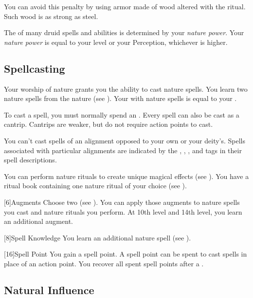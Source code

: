         You can avoid this penalty by using armor made of wood altered with the  ritual.
        Such wood is as strong as steel.

        The  of many druid spells and abilities is determined by your \textit{nature power}.
        Your \textit{nature power} is equal to your level or your Perception, whichever is higher.

    \subsection{Spellcasting}

        Your worship of nature grants you the ability to cast nature spells.
        You learn two nature spells from the nature  (see ).
        Your  with nature spells is equal to your .

        To cast a spell, you must normally spend an .
        Every spell can also be cast as a cantrip.
        Cantrips are weaker, but do not require action points to cast.

        You can't cast spells of an alignment opposed to your own or your deity's.
        Spells associated with particular alignments are indicated by the , , , and  tags in their spell descriptions.

        You can perform nature rituals to create unique magical effects (see ).
        You have a ritual book containing one nature ritual of your choice (see ).

        [6]{Augments}
        Choose two  (see ).
        You can apply those augments to nature spells you cast and nature rituals you perform.
        At 10th level and 14th level, you learn an additional augment.

        [8]{Spell Knowledge}
        You learn an additional nature spell (see ).

        [16]{Spell Point} 
        You gain a spell point.
        A spell point can be spent to cast spells in place of an action point.
        You recover all spent spell points after a .

    \subsection{Natural Influence}

